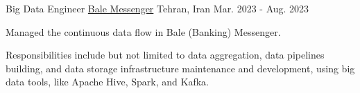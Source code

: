 

\begin{cventries}

  \cventry
    {Big Data Engineer} %
    {\href{https://bale.ai/}{Bale Messenger}} %
    {Tehran, Iran} %
    {Mar. 2023 - Aug. 2023} %
    {
      \begin{cvitems} %
        \item {Managed the continuous data flow in Bale (Banking) Messenger.}
        \item {Responsibilities include but not limited to data aggregation, data pipelines building, and data storage infrastructure maintenance and development, using big data tools, like Apache Hive, Spark, and Kafka.}
      \end{cvitems}
    }



\end{cventries}
